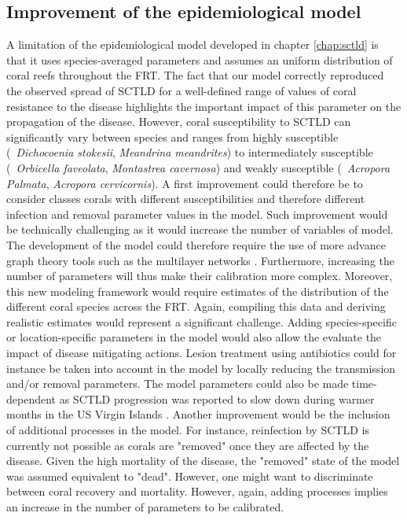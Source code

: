 \subsection*{Improvement of the epidemiological model}
A limitation of the epidemiological model developed in chapter \ref{chap:sctld} is that it uses species-averaged parameters and assumes an uniform distribution of coral reefs throughout the FRT. The fact that our model correctly reproduced the observed spread of SCTLD for a well-defined range of values of coral resistance to the disease highlights the important impact of this parameter on the propagation of the disease. However, coral susceptibility to SCTLD can significantly vary between species and ranges from highly susceptible (\eg~\textit{Dichocoenia stokesii}, \textit{Meandrina meandrites}) to intermediately susceptible (\eg~\textit{Orbicella faveolata}, \textit{Montastrea cavernosa}) and weakly susceptible (\eg~\textit{Acropora Palmata}, \textit{Acropora cervicornis}). A first improvement could therefore be to consider classes corals with different susceptibilities and therefore different infection and removal parameter values in the model. Such improvement would be technically challenging as it would increase the number of variables of model. The development of the model could therefore require the use of more advance graph theory tools such as the multilayer networks \citep{kivela2014multilayer,pilosof2017multilayer}. Furthermore, increasing the number of parameters will thus make their calibration more complex. Moreover, this new modeling framework would require estimates of the distribution of the different coral species across the FRT. Again, compiling this data and deriving realistic estimates would represent a significant challenge. Adding species-specific or location-specific parameters in the model would also allow the evaluate the impact of disease mitigating actions. Lesion treatment using antibiotics could for instance be taken into account in the model by locally reducing the transmission and/or removal parameters. The model parameters could also be made time-dependent as SCTLD progression was reported to slow down during warmer months in the US Virgin Islands \citep{meiling20203d}. Another improvement would be the inclusion of additional processes in the model. For instance, reinfection by SCTLD is currently not possible as corals are "removed" once they are affected by the disease. Given the high mortality of the disease, the "removed" state of the model was assumed equivalent to "dead". However, one might want to discriminate between coral recovery and mortality. However, again, adding processes implies an increase in the number of parameters to be calibrated.

